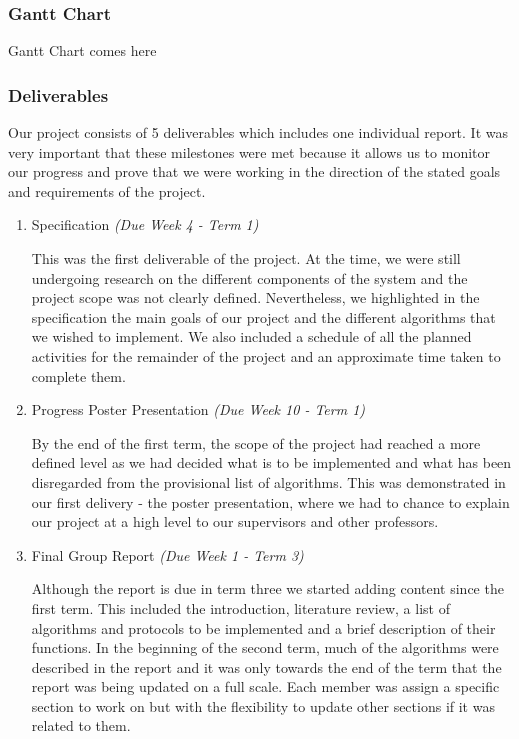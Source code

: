 \subsubsection{Gantt Chart}

Gantt Chart comes here

\subsubsection{Deliverables}

Our project consists of 5 deliverables which includes one individual report. It was very important that these milestones were met because it allows us to monitor our progress and prove that we were working in the direction of the stated goals and requirements of the project.

\begin{enumerate}
	\item Specification \emph{(Due Week 4 - Term 1)}
	
	This was the first deliverable of the project. At the time, we were still undergoing research on the different components of the system and the project scope was not clearly defined. Nevertheless, we highlighted in the specification the main goals of our project and the different algorithms that we wished to implement. We also included a schedule of all the planned activities for the remainder of the project and an approximate time taken to complete them.
	
    \item Progress Poster Presentation \emph{(Due Week 10 - Term 1)}
    
	By the end of the first term, the scope of the project had reached a more defined level as we had decided what is to be implemented and what has been disregarded from the provisional list of algorithms. This was demonstrated in our first delivery - the poster presentation, where we had to chance to explain our project at a high level to our supervisors and other professors.
    
    \item Final Group Report \emph{(Due Week 1 - Term 3)}
    
	Although the report is due in term three we started adding content since the first term. This included the introduction, literature review, a list of algorithms and protocols to be implemented and a brief description of their functions. In the beginning of the second term, much of the algorithms were described in the report and it was only towards the end of the term that the report was being updated on a full scale. Each member was assign a specific section to work on but with the flexibility to update other sections if it was related to them.
	

\end{enumerate}
